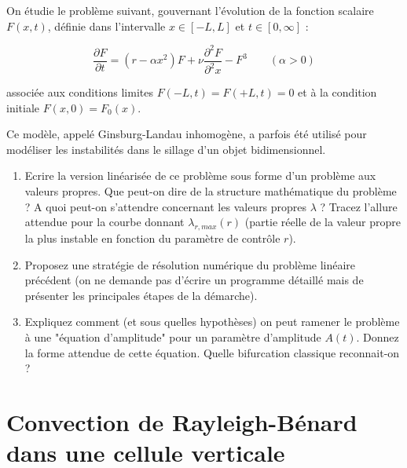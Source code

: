 \documentclass[a4paper,12pt]{article}
\begin{document}
On étudie le problème suivant, gouvernant l'évolution de la fonction scalaire $F(x,t)$, définie dans l'intervalle $x\in [-L,L]$ et $t\in [0,\infty]$ :

\begin{equation}
\frac{\partial F}{\partial t} = (r - \alpha x^2) F + \nu  \frac{\partial^2 F}{\partial^2 x} - F^3 
\quad \quad (\alpha >0)
\end{equation}


associée aux conditions limites $F(-L,t) = F(+L,t) = 0$ et à la condition initiale $F(x,0) = F_0(x)$.

Ce modèle, appelé Ginsburg-Landau inhomogène, a parfois été utilisé pour modéliser les instabilités dans le sillage d'un objet bidimensionnel.


\begin{enumerate}

\item Ecrire la version linéarisée de ce problème sous forme d'un problème aux valeurs propres. Que peut-on dire de la structure mathématique du problème ? A quoi peut-on s'attendre concernant les valeurs propres $\lambda$ ? Tracez l'allure attendue pour la courbe donnant $\lambda_{r,max}(r)$ (partie réelle de la valeur propre la plus instable en fonction du paramètre de contrôle $r$).


\item Proposez une stratégie de résolution numérique du problème linéaire précédent (on ne demande pas d'écrire un programme détaillé mais de présenter les principales étapes de la démarche).


\item 
Expliquez comment (et sous quelles hypothèses) on peut ramener le problème à une "équation d'amplitude" pour un paramètre d'amplitude $A(t)$. 
Donnez la forme attendue de cette équation. Quelle bifurcation classique reconnait-on ?



\end{enumerate}


\section{Convection de Rayleigh-Bénard dans une cellule verticale}
\end{document}
